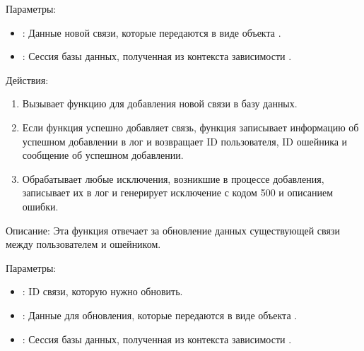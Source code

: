 \documentclass[letterpaper,10pt,russian]{sphinxmanual}
\begin{document}
\sphinxAtStartPar
Параметры:
\begin{itemize}
\item {} 
\sphinxAtStartPar
{}: Данные новой связи, которые передаются в виде объекта .

\item {} 
\sphinxAtStartPar
{}: Сессия базы данных, полученная из контекста зависимости .

\end{itemize}

\sphinxAtStartPar
Действия:
\begin{enumerate}
%
\item {} 
\sphinxAtStartPar
Вызывает функцию  для добавления новой связи в базу данных.

\item {} 
\sphinxAtStartPar
Если функция  успешно добавляет связь, функция записывает информацию об успешном добавлении в лог и возвращает ID пользователя, ID ошейника и сообщение об успешном добавлении.

\item {} 
\sphinxAtStartPar
Обрабатывает любые исключения, возникшие в процессе добавления, записывает их в лог и генерирует исключение  с кодом 500 и описанием ошибки.

\end{enumerate}

\sphinxAtStartPar
{}

\sphinxAtStartPar
Описание: Эта функция отвечает за обновление данных существующей связи между пользователем и ошейником.

\sphinxAtStartPar
Параметры:
\begin{itemize}
\item {} 
\sphinxAtStartPar
{}: ID связи, которую нужно обновить.

\item {} 
\sphinxAtStartPar
{}: Данные для обновления, которые передаются в виде объекта .

\item {} 
\sphinxAtStartPar
{}: Сессия базы данных, полученная из контекста зависимости .

\end{itemize}
\end{document}
